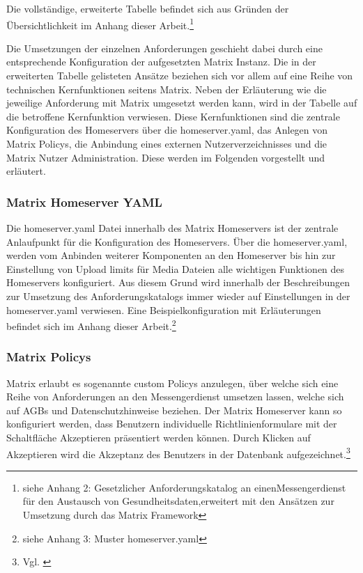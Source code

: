 Die vollständige, erweiterte Tabelle befindet sich aus Gründen der Übersichtlichkeit im Anhang dieser Arbeit.\footnote{siehe Anhang 2: Gesetzlicher Anforderungskatalog an einenMessengerdienst für den Austausch von Gesundheitsdaten,erweitert mit den Ansätzen zur Umsetzung durch das Matrix Framework} 

Die Umsetzungen der einzelnen Anforderungen geschieht dabei durch eine entsprechende Konfiguration der aufgesetzten Matrix Instanz. Die in der erweiterten Tabelle gelisteten Ansätze beziehen sich vor allem auf eine Reihe von technischen Kernfunktionen seitens Matrix. Neben der Erläuterung wie die jeweilige Anforderung mit Matrix umgesetzt werden kann, wird in der Tabelle auf die betroffene Kernfunktion verwiesen. Diese Kernfunktionen sind die zentrale Konfiguration des Homeservers über die homeserver.yaml, das Anlegen von Matrix Policys,
die Anbindung eines externen Nutzerverzeichnisses und die Matrix Nutzer Administration. Diese werden im Folgenden vorgestellt und erläutert.

\subsubsection{Matrix Homeserver YAML}\label{chapter:vdmf}
Die homeserver.yaml Datei innerhalb des Matrix Homeservers ist der zentrale Anlaufpunkt für die Konfiguration des Homeservers.
Über die homeserver.yaml, werden vom Anbinden weiterer Komponenten an den Homeserver bis hin zur Einstellung von Upload limits für Media Dateien alle wichtigen Funktionen des Homeservers konfiguriert. Aus diesem Grund wird innerhalb der Beschreibungen zur Umsetzung des Anforderungskatalogs immer wieder auf Einstellungen in der homeserver.yaml verwiesen. Eine Beispielkonfiguration mit Erläuterungen befindet sich im Anhang dieser Arbeit.\footnote{siehe Anhang 3: Muster homeserver.yaml} 

\subsubsection{Matrix Policys}\label{chapter:vdmf}
Matrix erlaubt es sogenannte custom Policys anzulegen, über welche sich eine Reihe von Anforderungen an den Messengerdienst umsetzen lassen, welche sich auf AGBs und Datenschutzhinweise beziehen.
Der Matrix Homeserver kann so konfiguriert werden, dass Benutzern individuelle Richtlinienformulare mit der Schaltfläche \glqq Akzeptieren\grqq{} präsentiert werden können. Durch Klicken auf \glqq Akzeptieren\grqq{} wird die Akzeptanz des Benutzers in der Datenbank aufgezeichnet.\footnote{Vgl. \cite{Matrix.org-custom-policies2020}}

